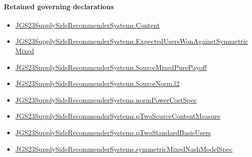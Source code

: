 \documentclass[10pt]{article}
\begin{document}
\paragraph{Retained governing declarations}
\begin{itemize}\raggedright
\item \hyperlink{governing-declaration-367305fda50f0ada}{JGS23\allowbreak{}Supply\allowbreak{}Side\allowbreak{}Recommender\allowbreak{}Systems.\allowbreak{}Content}
\item \hyperlink{governing-declaration-3a110916ca7725ab}{JGS23\allowbreak{}Supply\allowbreak{}Side\allowbreak{}Recommender\allowbreak{}Systems.\allowbreak{}Expected\allowbreak{}Users\allowbreak{}Won\allowbreak{}Against\allowbreak{}Symmetric\allowbreak{}Mixed}
\item \hyperlink{governing-declaration-d3239873ad21d76c}{JGS23\allowbreak{}Supply\allowbreak{}Side\allowbreak{}Recommender\allowbreak{}Systems.\allowbreak{}Source\allowbreak{}Mixed\allowbreak{}Pure\allowbreak{}Payoff}
\item \hyperlink{governing-declaration-9299663ffe3ecb38}{JGS23\allowbreak{}Supply\allowbreak{}Side\allowbreak{}Recommender\allowbreak{}Systems.\allowbreak{}Source\allowbreak{}Norm.\allowbreak{}l2}
\item \hyperlink{governing-declaration-6ba13dc1cae95e6e}{JGS23\allowbreak{}Supply\allowbreak{}Side\allowbreak{}Recommender\allowbreak{}Systems.\allowbreak{}norm\allowbreak{}Power\allowbreak{}Cost\allowbreak{}Spec}
\item \hyperlink{governing-declaration-fc211c75589fb22a}{JGS23\allowbreak{}Supply\allowbreak{}Side\allowbreak{}Recommender\allowbreak{}Systems.\allowbreak{}p\allowbreak{}Two\allowbreak{}Source\allowbreak{}Content\allowbreak{}Measure}
\item \hyperlink{governing-declaration-b00b3d57e66564ea}{JGS23\allowbreak{}Supply\allowbreak{}Side\allowbreak{}Recommender\allowbreak{}Systems.\allowbreak{}p\allowbreak{}Two\allowbreak{}Standard\allowbreak{}Basis\allowbreak{}Users}
\item \hyperlink{paper-prerequisite-b412efba7deb757f}{JGS23\allowbreak{}Supply\allowbreak{}Side\allowbreak{}Recommender\allowbreak{}Systems.\allowbreak{}symmetric\allowbreak{}Mixed\allowbreak{}Nash\allowbreak{}Model\allowbreak{}Spec}
\end{itemize}
\end{document}
